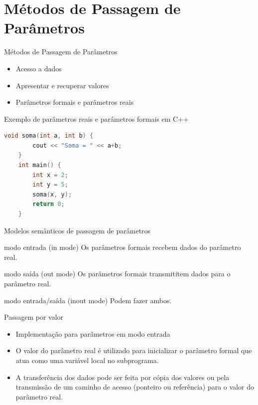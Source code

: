 
\section{Métodos de Passagem de Parâmetros}
\begin{frame}[fragile]{Métodos de Passagem de Parâmetros}
	\begin{itemize}
	  \item Acesso a dados
	  \item Apresentar e recuperar valores
	  \item Parâmetros formais e parâmetros reais
	\end{itemize}
	
	Exemplo de parâmetros reais e parâmetros formais em C++
	\begin{lstlisting}[language=c++]
	void soma(int a, int b) {
	    cout << "Soma = " << a+b; 
	}
	int main() {
	    int x = 2;
	    int y = 5;
	    soma(x, y);
	    return 0;
	}
	\end{lstlisting}	
\end{frame}

\begin{frame}[fragile]{Modelos semânticos de passagem de parâmetros}
	\begin{block}{modo entrada (in mode)}
		Os parâmetros formais recebem dados do parâmetro real.
	\end{block}

	\begin{block}{modo saída (out mode)}
		Os parâmetros formais transmititem dados para o parâmetro real.
	\end{block}

	\begin{block}{modo entrada/saída (inout mode)}
		Podem fazer ambos.
	\end{block}
\end{frame}

\begin{frame}[fragile]{Passagem por valor}
	\begin{itemize}
	  \item Implementação para parâmetros em modo entrada 
	  \item O valor do parâmetro real é utilizado para inicializar o parâmetro formal que atua como uma variável local no subprograma. 
	  \item A transferência dos dados pode ser feita por cópia dos valores ou pela transmissão de um caminho de acesso (ponteiro ou referência) para o valor do parâmetro real. 
	\end{itemize}
\end{frame}

